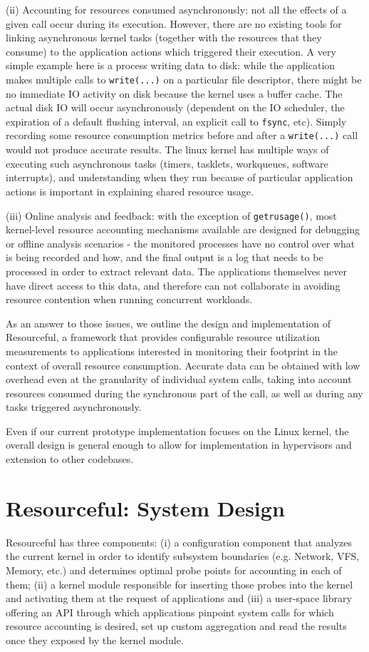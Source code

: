 \documentclass[letterpaper,twocolumn,10pt]{article}
\newcommand{\pname}{Resourceful}
\begin{document}
(ii) Accounting for resources consumed asynchronously: not all the effects of a given call occur during its execution. However, there are no existing tools for linking asynchronous kernel tasks (together with the resources that they consume) to the application actions which triggered their execution. A very simple example here is a process writing data to disk: while the application makes multiple calls to \texttt{write(...)} on a particular file descriptor, there might be no immediate IO activity on disk because the kernel uses a buffer cache. The actual disk IO will occur asynchronously (dependent on the IO scheduler, the expiration of a default flushing interval, an explicit call to \texttt{fsync}, etc). Simply recording some resource consumption metrics before and after a \texttt{write(...)} call would not produce accurate results. The linux kernel has multiple ways of executing such asynchronous tasks (timers, tasklets, workqueues, software interrupts), and understanding when they run because of particular application actions is important in explaining shared resource usage.

(iii) Online analysis and feedback: with the exception of \texttt{getrusage()}, most kernel-level resource accounting mechanisms available are designed for debugging or offline analysis scenarios - the monitored processes have no control over what is being recorded and how, and the final output is a log that needs to be processed in order to extract relevant data. The applications themselves never have direct access to this data, and therefore can not collaborate in avoiding resource contention when running concurrent workloads.

As an answer to those issues, we outline the design and implementation of \pname, a framework that provides configurable resource utilization measurements to applications interested in monitoring their footprint in the context of overall resource consumption. Accurate data can be obtained with low overhead even at the granularity of individual system calls, taking into account resources consumed during the synchronous part of the call, as well as during any tasks triggered asynchronously. 

Even if our current prototype implementation focuses on the Linux kernel, the overall design is general enough to allow for implementation in hypervisors and extension to other codebases.

\section{Resourceful: System Design}
\pname{ } has three components: (i) a configuration component that analyzes the current kernel in order to identify subsystem boundaries (e.g. Network, VFS, Memory, etc.) and determines optimal probe points for accounting in each of them; (ii) a kernel module responsible for inserting those probes into the kernel and activating them at the request of applications and (iii) a user-space library offering an API through which applications pinpoint system calls for which resource accounting is desired, set up custom aggregation and read the results once they exposed by the kernel module. 
\end{document}
